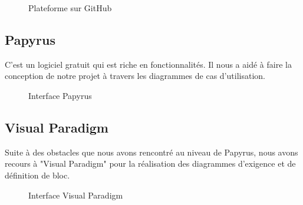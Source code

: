 	\begin{figure}[H]
		\begin{center}
			\centering
		\end{center}
		\caption{Plateforme sur GitHub}
	\end{figure}
	\subsection{Papyrus}
	C'est un logiciel gratuit qui est riche en fonctionnalités. Il nous a aidé à faire la conception de notre projet à travers les diagrammes de cas d'utilisation.
	\begin{figure}[H]
		\begin{center}
			\centering
		\end{center}
		\caption{Interface Papyrus}
	\end{figure}
	
	\subsection{Visual Paradigm}
	Suite à des obstacles que nous avons rencontré au niveau de Papyrus, nous avons recours à "Visual Paradigm" pour la réalisation des diagrammes d'exigence et de définition de bloc.
	\begin{figure}[H]
		\begin{center}
			\centering
		\end{center}
		\caption{Interface Visual Paradigm}
	\end{figure}
